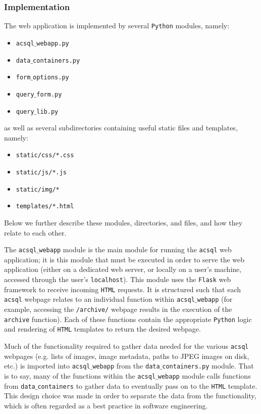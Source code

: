 \documentclass[10pt,journal,compsoc]{IEEEtran}
\begin{document}
\subsubsection{Implementation}

The web application is implemented by several \texttt{Python} modules, namely:

\begin{itemize}
\item \texttt{acsql$\_$webapp.py}
\item \texttt{data$\_$containers.py}
\item \texttt{form$\_$options.py}
\item \texttt{query$\_$form.py}
\item \texttt{query$\_$lib.py}
\end{itemize}

as well as several subdirectories containing useful static files and templates, namely:

\begin{itemize}
\item \texttt{static/css/*.css}
\item \texttt{static/js/*.js}
\item \texttt{static/img/*}
\item \texttt{templates/*.html}
\end{itemize}

Below we further describe these modules, directories, and files, and how they relate to each other.

The \texttt{acsql$\_$webapp} module is the main module for running the \texttt{acsql} web application;
it is this module that must be executed in order to serve the web application (either on a dedicated
web server, or locally on a user's machine, accessed through the user's \texttt{localhost}).  This module
uses the \texttt{Flask} web framework to receive incoming \texttt{HTML} requests.  It is structured such
that each \texttt{acsql} webpage relates to an individual function within \texttt{acsql$\_$webapp} (for
example, accessing the \texttt{/archive/} webpage results in the execution of the \texttt{archive} function).
Each of these functions contain the appropriate \texttt{Python} logic and rendering of \texttt{HTML} templates
to return the desired webpage.

Much of the functionality required to gather data needed for the various \texttt{acsql} webpages (e.g. lists
of images, image metadata, paths to JPEG images on disk, etc.) is imported into \texttt{acsql$\_$webapp} from
the \texttt{data$\_$containers.py} module.  That is to say, many of the functions within the
\texttt{acsql$\_$webapp} module calls functions from \texttt{data$\_$containers} to gather data to eventually
pass on to the \texttt{HTML} template.  This design choice was made in order to separate the data from the
functionality, which is often regarded as a best practice in software engineering.
\end{document}
